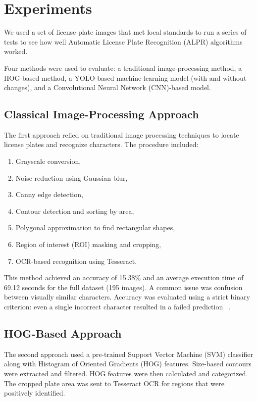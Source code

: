 \documentclass[runningheads]{llncs}
\begin{document}
\section{Experiments}
\label{sec:experiments}

We used a set of license plate images that met local standards to run a series of tests to see how well Automatic License Plate Recognition (ALPR) algorithms worked. 

Four methods were used to evaluate: a traditional image-processing method, a HOG-based method, a YOLO-based machine learning model (with and without changes), and a Convolutional Neural Network (CNN)-based model.

\subsection{Classical Image-Processing Approach}
The first approach relied on traditional image processing techniques to locate license plates and recognize characters. The procedure included:
\begin{enumerate}
    \item Grayscale conversion,
    \item Noise reduction using Gaussian blur,
    \item Canny edge detection,
    \item Contour detection and sorting by area,
    \item Polygonal approximation to find rectangular shapes,
    \item Region of interest (ROI) masking and cropping,
    \item OCR-based recognition using Tesseract.
\end{enumerate}

This method achieved an accuracy of 15.38\% and an average execution time of 69.12 seconds for the full dataset (195 images). A common issue was confusion between visually similar characters. Accuracy was evaluated using a strict binary criterion: even a single incorrect character resulted in a failed prediction ~\cite{kagglePlateNumber}.

\subsection{HOG-Based Approach}
The second approach used a pre-trained Support Vector Machine (SVM) classifier along with Histogram of Oriented Gradients (HOG) features. Size-based contours were extracted and filtered. HOG features were then calculated and categorized. The cropped plate area was sent to Tesseract OCR for regions that were positively identified.
\end{document}
